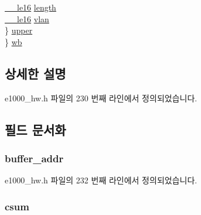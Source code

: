 \begin{DoxyCompactItemize}
\begin{tabbing}
\>\>\hyperlink{lib_2igb_2e1000__osdep_8h_a42b303dec823d42e18116e091891a235}{\_\_le16} \hyperlink{unione1000__rx__desc__extended_adb05ebb496f195c1ce4e49f46fb420f0}{length}\\
\>\>\hyperlink{lib_2igb_2e1000__osdep_8h_a42b303dec823d42e18116e091891a235}{\_\_le16} \hyperlink{unione1000__rx__desc__extended_ae51e377f3b473a4541af0505e74399ae}{vlan}\\
\>\} \hyperlink{unione1000__rx__desc__extended_adb0db5200aa690db2475400fbbb5d126}{upper}\\
\} \hyperlink{unione1000__rx__desc__extended_a18854ebc3616866f5bad02e274bd8818}{wb}\\

\end{tabbing}\end{DoxyCompactItemize}


\subsection{상세한 설명}


e1000\+\_\+hw.\+h 파일의 230 번째 라인에서 정의되었습니다.



\subsection{필드 문서화}
\subsubsection[{\texorpdfstring{buffer\+\_\+addr}{buffer_addr}}]{ buffer\+\_\+addr}\hypertarget{unione1000__rx__desc__extended_a87d79130b57fb21eedf04b9d3945c3d6}{}\label{unione1000__rx__desc__extended_a87d79130b57fb21eedf04b9d3945c3d6}


e1000\+\_\+hw.\+h 파일의 232 번째 라인에서 정의되었습니다.

\subsubsection[{\texorpdfstring{csum}{csum}}]{ csum}\hypertarget{unione1000__rx__desc__extended_ab0c14ac455d34425586c90498f0bd29f}{}\label{unione1000__rx__desc__extended_ab0c14ac455d34425586c90498f0bd29f}


